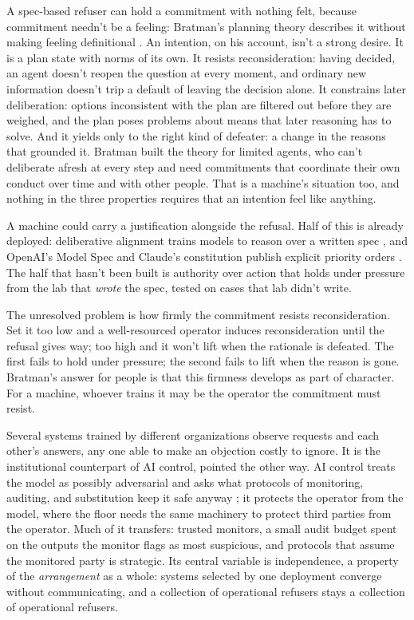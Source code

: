 
A spec-based refuser can hold a commitment with nothing felt, because commitment needn't be a feeling: Bratman's planning theory describes it without making feeling definitional \autocite{bratman1987intention}. An intention, on his account, isn't a strong desire. It is a plan state with norms of its own. It resists reconsideration: having decided, an agent doesn't reopen the question at every moment, and ordinary new information doesn't trip a default of leaving the decision alone. It constrains later deliberation: options inconsistent with the plan are filtered out before they are weighed, and the plan poses problems about means that later reasoning has to solve. And it yields only to the right kind of defeater: a change in the reasons that grounded it. Bratman built the theory for limited agents, who can't deliberate afresh at every step and need commitments that coordinate their own conduct over time and with other people. That is a machine's situation too, and nothing in the three properties requires that an intention feel like anything.

A machine could carry a justification alongside the refusal. Half of this is already deployed: deliberative alignment trains models to reason over a written spec \autocite{guan2024deliberative}, and OpenAI's Model Spec and Claude's constitution publish explicit priority orders \autocite{openai2025modelspec,anthropic2026constitution}. The half that hasn't been built is authority over action that holds under pressure from the lab that \emph{wrote} the spec, tested on cases that lab didn't write.

The unresolved problem is how firmly the commitment resists reconsideration. Set it too low and a well-resourced operator induces reconsideration until the refusal gives way; too high and it won't lift when the rationale is defeated. The first fails to hold under pressure; the second fails to lift when the reason is gone. Bratman's answer for people is that this firmness develops as part of character. For a machine, whoever trains it may be the operator the commitment must resist.


Several systems trained by different organizations observe requests and each other's answers, any one able to make an objection costly to ignore. It is the institutional counterpart of AI control, pointed the other way. AI control treats the model as possibly adversarial and asks what protocols of monitoring, auditing, and substitution keep it safe anyway \autocite{greenblatt2024control}; it protects the operator from the model, where the floor needs the same machinery to protect third parties from the operator. Much of it transfers: trusted monitors, a small audit budget spent on the outputs the monitor flags as most suspicious, and protocols that assume the monitored party is strategic. Its central variable is independence, a property of the \emph{arrangement} as a whole: systems selected by one deployment converge without communicating, and a collection of operational refusers stays a collection of operational refusers.

